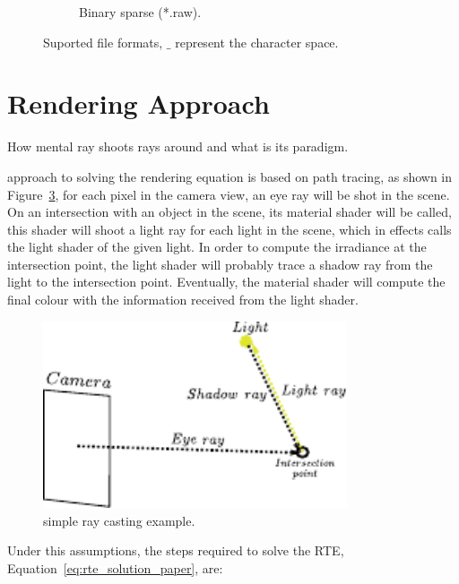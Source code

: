 \begin{figure}[htpb!]
\begin{subfigure}[t]{0.282\textwidth}
                \caption{Binary sparse (*.raw).}
                \label{fig:file_format_binary}
        \end{subfigure}
        \caption{Suported file formats, $\_$ represent the character space.}
        \label{fig:file_format}
\end{figure}

\section{\MentalRay Rendering Approach}
\label{sec:mental_ray_rendering_approach}

How mental ray shoots rays around and what is its paradigm.

\MentalRay approach to solving the rendering equation is based on path tracing, as shown in Figure~\ref{fig:mental_ray_model}, for each pixel in the camera view, an eye ray will be shot in the scene.
On an intersection with an object in the scene, its material shader will be called, this shader will shoot a light ray for each light in the scene, which in effects calls the light shader of the given light.
In order to compute the irradiance at the intersection point, the light shader will probably trace a shadow ray from the light to the intersection point.
Eventually, the material shader will compute the final colour with the information received from the light shader. 

\begin{figure}[htbp!]
\centering
\includegraphics[width=0.8\textwidth]{img/mental_ray_model}
	\caption{\MentalRay simple ray casting example.}
	\label{fig:mental_ray_model}
\end{figure}

Under this assumptions, the steps required to solve the RTE, Equation~\ref{eq:rte_solution_paper}, are:

